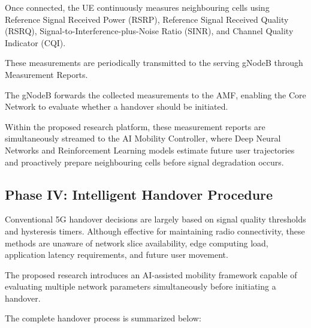 \documentclass[12pt,a4paper]{article}\usepackage[a4paper,margin=1in]{geometry}\usepackage{graphicx}\usepackage{longtable}\usepackage{booktabs}\usepackage{hyperref}\usepackage{enumitem}\usepackage{amsmath}\usepackage{tikz}\usepackage{pgfgantt}\usepackage{setspace}\setstretch{1.15}\usetikzlibrary{positioning,arrows.meta,shapes.geometric}
\begin{document}
	Once connected, the UE continuously measures neighbouring cells using Reference Signal Received Power (RSRP), Reference Signal Received Quality (RSRQ), Signal-to-Interference-plus-Noise Ratio (SINR), and Channel Quality Indicator (CQI).
	
	These measurements are periodically transmitted to the serving gNodeB through Measurement Reports.
	
	The gNodeB forwards the collected measurements to the AMF, enabling the Core Network to evaluate whether a handover should be initiated.
	
	Within the proposed research platform, these measurement reports are simultaneously streamed to the AI Mobility Controller, where Deep Neural Networks and Reinforcement Learning models estimate future user trajectories and proactively prepare neighbouring cells before signal degradation occurs.
	
	
	\subsection{Phase IV: Intelligent Handover Procedure}
	
	Conventional 5G handover decisions are largely based on signal quality thresholds and hysteresis timers. Although effective for maintaining radio connectivity, these methods are unaware of network slice availability, edge computing load, application latency requirements, and future user movement.
	
	The proposed research introduces an AI-assisted mobility framework capable of evaluating multiple network parameters simultaneously before initiating a handover.
	
	The complete handover process is summarized below:
	
\end{document}
